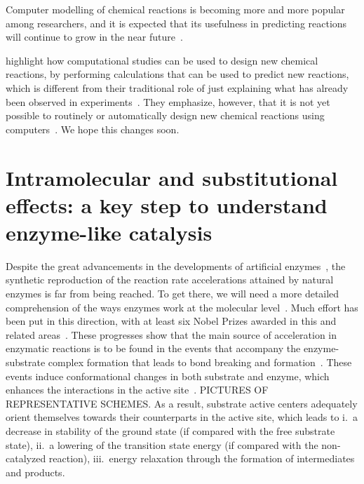 Computer modelling of chemical reactions is becoming more and more popular among researchers,
and it is expected that its usefulness in predicting reactions will continue to grow in the near future~\cite{Ahn_2019}.

\citeauthor{Ahn_2019} highlight how computational studies can be used to design new chemical reactions,
by performing calculations that can be used to predict new reactions,
which is different from their traditional role of just explaining what has already been observed in experiments~\cite{Ahn_2019}.
They emphasize, however,
that it is not yet possible to routinely or automatically design new chemical reactions using computers~\cite{Ahn_2019}.
We hope this changes soon.

\section{Intramolecular and substitutional effects:
  a key step to understand enzyme-like catalysis}

Despite the great advancements in the developments of artificial enzymes~\cite{Breslow_1995},
the synthetic reproduction of the reaction rate accelerations attained by
natural enzymes is far from being reached.
To get there,
we will need a more detailed comprehension of the ways enzymes
work at the molecular level~\cite{Catalysis_in_Chemistry_and_Enzymology}.
Much effort has been put in this direction,
with at least six Nobel Prizes
awarded in this and related areas~\cite{Nobel_1929,Nobel_1946,Nobel_1957,Nobel_1975,Nobel_1997,Nobel_2013}.
These progresses show that the main source of acceleration in
enzymatic reactions is to be found in the events that accompany the
enzyme-substrate complex formation that leads to bond breaking and
formation~\cite{Catalysis_in_Chemistry_and_Enzymology}.
These events induce conformational changes in both substrate and enzyme,
which
enhances the interactions in the active site~\cite{Fischer_1890,Fischer_1894,Koshland_1958,Dafforn_1971,Kirby_1996}.
PICTURES OF REPRESENTATIVE SCHEMES.\@
As a result,
substrate active centers adequately orient themselves towards
their counterparts in the active site,
which leads to
i.\ a decrease in stability of the ground state (if compared with the
free substrate state),
ii.\ a lowering of the transition state energy (if compared with the
non-catalyzed reaction),
iii.\ energy relaxation through the formation of intermediates and
products.

